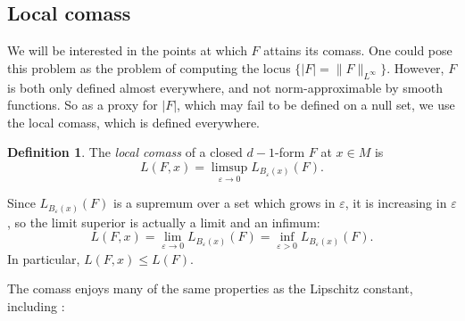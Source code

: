 \documentclass[reqno,11pt]{amsart}
\newcommand{\dfn}[1]{\emph{#1}\index{#1}}
\theoremstyle{definition}
\newtheorem{definition}[theorem]{Definition}
\numberwithin{equation}{section}
\begin{document}
\subsection{Local comass}
We will be interested in the points at which $F$ attains its comass.
One could pose this problem as the problem of computing the locus $\{|F| = \|F\|_{L^\infty}\}$.
However, $F$ is both only defined almost everywhere, and not norm-approximable by smooth functions.
So as a proxy for $|F|$, which may fail to be defined on a null set, we use the local comass, which is defined everywhere.

\begin{definition}
The \dfn{local comass} of a closed $d - 1$-form $F$ at $x \in M$ is 
$$L(F, x) = \limsup_{\varepsilon \to 0} L_{B_\varepsilon(x)}(F).$$
\end{definition}

Since $L_{B_\varepsilon(x)}(F)$ is a supremum over a set which grows in $\varepsilon$, it is increasing in $\varepsilon$, so the limit superior is actually a limit and an infimum:
$$L(F, x) = \lim_{\varepsilon \to 0} L_{B_\varepsilon(x)}(F) = \inf_{\varepsilon > 0} L_{B_\varepsilon(x)}(F).$$
In particular, $L(F, x) \leq L(F)$.

The comass enjoys many of the same properties as the Lipschitz constant, including \cite[Lemma 4.3]{Crandall2008}:
\end{document}
